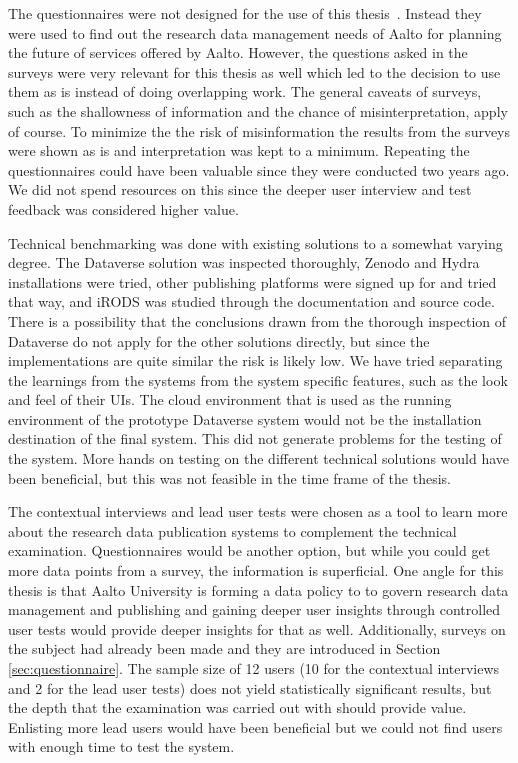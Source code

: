The questionnaires were not designed for the use of this thesis~\cite{survey1, survey2}. Instead they were used
to find out the research data management needs of Aalto for planning the
future of services offered by Aalto. However, the questions asked in the
surveys were very relevant for this thesis as well which led to the decision
to use them as is instead of doing overlapping work. The general caveats of
surveys, such as the shallowness of information and the chance of
misinterpretation, apply of course. To minimize the the risk of misinformation
the results from the surveys were shown as is and interpretation was kept to a
minimum. Repeating the questionnaires could have been valuable since they were
conducted two years ago. We did not spend resources on this since the deeper user
interview and test feedback was considered higher value.

Technical benchmarking was done with existing solutions to a somewhat varying degree.
The Dataverse solution was inspected thoroughly, Zenodo and Hydra installations were tried,
other publishing platforms were signed up for and tried that way, and iRODS
was studied through the documentation and source code. There is a possibility
that the conclusions drawn from the thorough inspection of Dataverse do not
apply for the other solutions directly, but since the implementations are quite
similar the risk is likely low. We have tried separating the learnings from the
systems from the system specific features, such as the look and feel of their
UIs. The cloud environment that is used as the running environment of the prototype
Dataverse system would not be the installation destination of the final system.
This did not generate problems for the testing of the system. More hands on
testing on the different technical solutions would have been beneficial, but
this was not feasible in the time frame of the thesis.

The contextual interviews and lead user tests were chosen as a tool to learn
more about the research data publication systems to complement the technical
examination. Questionnaires would be another option, but while you could get more data
points from a survey, the information is superficial. One angle for this thesis
is that Aalto University is forming a data policy to to govern research data
management and publishing and gaining deeper user insights through controlled
user tests would provide deeper insights for that as well. Additionally,
surveys on the subject had already been made and they are introduced in
Section \ref{sec:questionnaire}. The sample size
of 12 users (10 for the contextual interviews and 2 for the lead user tests)
does not yield statistically significant results, but the depth that the
examination was carried out with should provide value. Enlisting more lead
users would have been beneficial but we could not find users with enough
time to test the system.


